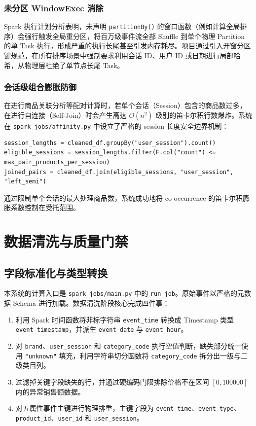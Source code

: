 \subsubsection{未分区 WindowExec 消除}

Spark 执行计划分析表明，未声明 \texttt{partitionBy()} 的窗口函数（例如计算全局排序）会强行触发全局重分区，将百万级事件流全部 Shuffle 到单个物理 Partition 的单 Task 执行，形成严重的执行长尾甚至引发内存耗尽。项目通过引入开窗分区键规范，在所有排序场景中强制要求利用会话 ID、用户 ID 或日期进行局部哈希，从物理层杜绝了单节点长尾 Task。

\subsubsection{会话级组合膨胀防御}

在进行商品关联分析等配对计算时，若单个会话（Session）包含的商品数过多，在进行自连接（Self-Join）时会产生高达 $O(n^2)$ 级别的笛卡尔积行数爆炸。系统在 \texttt{spark\_jobs/affinity.py} 中设立了严格的 session 长度安全边界机制：
\begin{lstlisting}[style=codexcode]
session_lengths = cleaned_df.groupBy("user_session").count()
eligible_sessions = session_lengths.filter(F.col("count") <= max_pair_products_per_session)
joined_pairs = cleaned_df.join(eligible_sessions, "user_session", "left_semi")
\end{lstlisting}
通过限制单个会话的最大处理商品数，系统成功地将 co-occurrence 的笛卡尔积膨胀系数控制在受托范围。

\section{数据清洗与质量门禁}

\subsection{字段标准化与类型转换}

本系统的计算入口是 \texttt{spark\_jobs/main.py} 中的 \texttt{run\_job}。原始事件以严格的元数据 Schema 进行加载。数据清洗阶段核心完成四件事：
\begin{enumerate}
    \item 利用 Spark 时间函数将非标字符串 \texttt{event\_time} 转换成 Timestamp 类型 \texttt{event\_timestamp}，并派生 \texttt{event\_date} 与 \texttt{event\_hour}。
    \item 对 \texttt{brand}、\texttt{user\_session} 和 \texttt{category\_code} 执行空值判断，缺失部分统一使用 \texttt{"unknown"} 填充，利用字符串切分函数将 \texttt{category\_code} 拆分出一级与二级类目列。
    \item 过滤掉关键字段缺失的行，并通过硬编码门限排除价格不在区间 $[0, 100000]$ 内的异常销售额数据。
    \item 对五属性事件主键进行物理排重，主键字段为 \texttt{event\_time}、\texttt{event\_type}、\texttt{product\_id}、\texttt{user\_id} 和 \texttt{user\_session}。
\end{enumerate}

